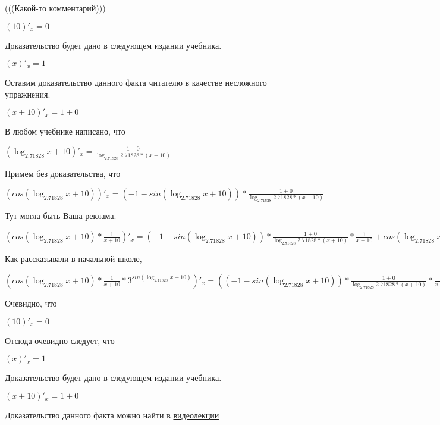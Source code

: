 \documentclass[12pt,a4paper,fleqn]{article}
\theoremstyle{definition}
\begin{document}
(((Какой-то комментарий))) 

$( 10 )'_{x} =  0 $

Доказательство будет дано в следующем издании учебника. 

$( x )'_{x} =  1 $

Оставим доказательство данного факта читателю в качестве несложного упражнения. 

$( x  +  10 )'_{x} =  1  +  0 $

В любом учебнике написано, что 

$(\log_{ 2.71828 }{ x  +  10 })'_{x} = \frac{ 1  +  0 }{\log_{ 2.71828 }{ 2.71828 } * ( x  +  10 )}
$

Примем без доказательства, что 

$(cos(\log_{ 2.71828 }{ x  +  10 }))'_{x} = ( -1  - sin(\log_{ 2.71828 }{ x  +  10 })) * \frac{ 1  +  0 }{\log_{ 2.71828 }{ 2.71828 } * ( x  +  10 )}
$

Тут могла быть Ваша реклама. 

$(cos(\log_{ 2.71828 }{ x  +  10 }) * \frac{ 1 }{ x  +  10 }
)'_{x} = ( -1  - sin(\log_{ 2.71828 }{ x  +  10 })) * \frac{ 1  +  0 }{\log_{ 2.71828 }{ 2.71828 } * ( x  +  10 )}
 * \frac{ 1 }{ x  +  10 }
 + cos(\log_{ 2.71828 }{ x  +  10 }) * \frac{ 0  * ( x  +  10 ) -  1  * ( 1  +  0 )}{( x  +  10 ) * ( x  +  10 )}
$

Как рассказывали в начальной школе, 

$(cos(\log_{ 2.71828 }{ x  +  10 }) * \frac{ 1 }{ x  +  10 }
 * { 3 }^{sin(\log_{ 2.71828 }{ x  +  10 })})'_{x} = (( -1  - sin(\log_{ 2.71828 }{ x  +  10 })) * \frac{ 1  +  0 }{\log_{ 2.71828 }{ 2.71828 } * ( x  +  10 )}
 * \frac{ 1 }{ x  +  10 }
 + cos(\log_{ 2.71828 }{ x  +  10 }) * \frac{ 0  * ( x  +  10 ) -  1  * ( 1  +  0 )}{( x  +  10 ) * ( x  +  10 )}
) * { 3 }^{sin(\log_{ 2.71828 }{ x  +  10 })} + cos(\log_{ 2.71828 }{ x  +  10 }) * \frac{ 1 }{ x  +  10 }
 * \log_{ 2.71828 }{ 3 } * cos(\log_{ 2.71828 }{ x  +  10 }) * \frac{ 1  +  0 }{\log_{ 2.71828 }{ 2.71828 } * ( x  +  10 )}
 * { 3 }^{sin(\log_{ 2.71828 }{ x  +  10 })}$

Очевидно, что 

$( 10 )'_{x} =  0 $

Отсюда очевидно следует, что 

$( x )'_{x} =  1 $

Доказательство будет дано в следующем издании учебника. 

$( x  +  10 )'_{x} =  1  +  0 $

Доказательство данного факта можно найти в \href{https://www.youtube.com/watch?v=dQw4w9WgXcQ}{видеолекции} 
\end{document}
